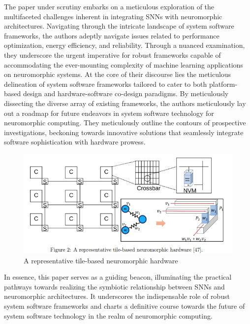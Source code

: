 \documentclass[screen, acmtog]{acmart}
\begin{document}
The paper under scrutiny embarks on a meticulous exploration of the multifaceted challenges inherent in integrating SNNs with neuromorphic architectures. Navigating through the intricate landscape of system software frameworks, the authors adeptly navigate issues related to performance optimization, energy efficiency, and reliability. Through a nuanced examination, they underscore the urgent imperative for robust frameworks capable of accommodating the ever-mounting complexity of machine learning applications on neuromorphic systems. At the core of their discourse lies the meticulous delineation of system software frameworks tailored to cater to both platform-based design and hardware-software co-design paradigms. By meticulously dissecting the diverse array of existing frameworks, the authors meticulously lay out a roadmap for future endeavors in system software technology for neuromorphic computing. They meticulously outline the contours of prospective investigations, beckoning towards innovative solutions that seamlessly integrate software sophistication with hardware prowess.

\begin{figure}
    \centering
    \includegraphics[width=1\linewidth]{Screenshot from 2024-04-28 20-11-45.png}
    \caption{A representative tile-based neuromorphic hardware \cite{SNNreview}}
    \label{fig:NC HW}
\end{figure}

In essence, this paper serves as a guiding beacon, illuminating the practical pathways towards realizing the symbiotic relationship between SNNs and neuromorphic architectures. It underscores the indispensable role of robust system software frameworks and charts a definitive course towards the future of system software technology in the realm of neuromorphic computing.
\end{document}
